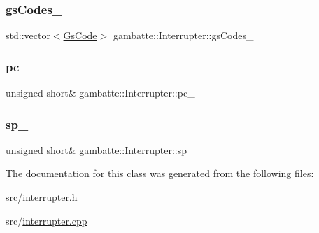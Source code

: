\subsubsection{\texorpdfstring{gs\+Codes\+\_\+}{gsCodes\_}}
{\footnotesize\ttfamily std\+::vector$<$\hyperlink{structgambatte_1_1GsCode}{Gs\+Code}$>$ gambatte\+::\+Interrupter\+::gs\+Codes\+\_\+\hspace{0.3cm}{\ttfamily [private]}}

\mbox{\label{classgambatte_1_1Interrupter_ab6f9e0d61e888fd694262341f001b3e4}} 
\subsubsection{\texorpdfstring{pc\+\_\+}{pc\_}}
{\footnotesize\ttfamily unsigned short\& gambatte\+::\+Interrupter\+::pc\+\_\+\hspace{0.3cm}{\ttfamily [private]}}

\mbox{\label{classgambatte_1_1Interrupter_a1898ada5e6a5b478aa42a4af5c0733c3}} 
\subsubsection{\texorpdfstring{sp\+\_\+}{sp\_}}
{\footnotesize\ttfamily unsigned short\& gambatte\+::\+Interrupter\+::sp\+\_\+\hspace{0.3cm}{\ttfamily [private]}}



The documentation for this class was generated from the following files\+:\begin{DoxyCompactItemize}
\item 
src/\hyperlink{interrupter_8h}{interrupter.\+h}\item 
src/\hyperlink{interrupter_8cpp}{interrupter.\+cpp}\end{DoxyCompactItemize}

